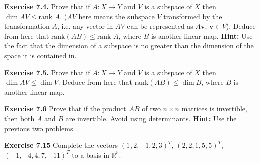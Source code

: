 \documentclass{article}
\begin{document}
\textbf{Exercise 7.4.} Prove that if $A : X \to Y$ and $V$ is a subspace of $X$ then $\dim AV \le \text{rank } A$. ($AV$ here means the subspace $V$ transformed by the transformation $A$, i.e. any vector in $AV$ can be represented as $A\mathbf{v}$, $\mathbf{v} \in V$). Deduce from here that $\text{rank}(AB) \le \text{rank } A$, where $B$ is another linear map. \textbf{Hint:} Use the fact that the dimension of a subspace is no greater than the dimension of the space it is contained in.

\textbf{Exercise 7.5.} Prove that if $A : X \to Y$ and $V$ is a subspace of $X$ then $\dim AV \le \dim V$. Deduce from here that $\text{rank}(AB) \le \dim B$, where $B$ is another linear map.

\textbf{Exercise 7.6} Prove that if the product $AB$ of two $n \times n$ matrices is invertible, then both $A$ and $B$ are invertible. Avoid using determinants. \textbf{Hint:} Use the previous two problems.

\textbf{Exercise 7.15} Complete the vectors $(1,2,-1,2,3)^T$, $(2,2,1,5,5)^T$, $(-1,-4,4,7,-11)^T$ to a basis in $\mathbb{R}^5$.
\end{document}
